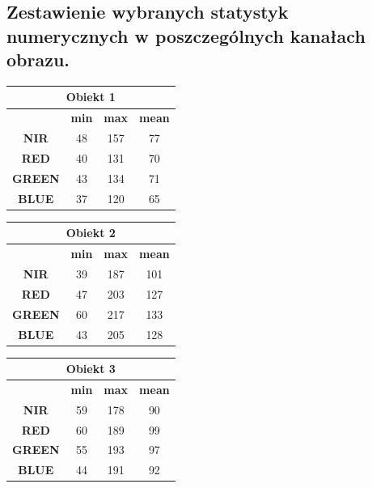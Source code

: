 \documentclass[a4paper,12pt]{article}  %
\begin{document}
\newpage
\subsection{Zestawienie wybranych statystyk numerycznych w poszczególnych kanałach obrazu.}

\begin{table}[h!]
\centering
\begin{tabular}{|c|c|c|c|}
\hline
\multicolumn{4}{|c|}{\textbf{Obiekt 1}} \\ \hline
\textbf{} & \textbf{min} & \textbf{max} & \textbf{mean} \\ \hline
\textbf{NIR} & 48 & 157 & 77\\ \hline
\textbf{RED} & 40 & 131 & 70\\ \hline
\textbf{GREEN} & 43 & 134 & 71\\ \hline
\textbf{BLUE} & 37 & 120 & 65\\ \hline
\end{tabular}
\end{table}

\begin{table}[h!]
\centering
\begin{tabular}{|c|c|c|c|}
\hline
\multicolumn{4}{|c|}{\textbf{Obiekt 2}} \\ \hline
\textbf{} & \textbf{min} & \textbf{max} & \textbf{mean} \\ \hline
\textbf{NIR} & 39 & 187 & 101\\ \hline
\textbf{RED} & 47 & 203 & 127\\ \hline
\textbf{GREEN} & 60 & 217 & 133\\ \hline
\textbf{BLUE} & 43 & 205 & 128\\ \hline
\end{tabular}
\end{table}

\begin{table}[h!]
\centering
\begin{tabular}{|c|c|c|c|}
\hline
\multicolumn{4}{|c|}{\textbf{Obiekt 3}} \\ \hline
\textbf{} & \textbf{min} & \textbf{max} & \textbf{mean} \\ \hline
\textbf{NIR} & 59 & 178 & 90\\ \hline
\textbf{RED} & 60 & 189 & 99\\ \hline
\textbf{GREEN} & 55 & 193 & 97\\ \hline
\textbf{BLUE} & 44 & 191 & 92\\ \hline
\end{tabular}
\end{table}
\end{document}
